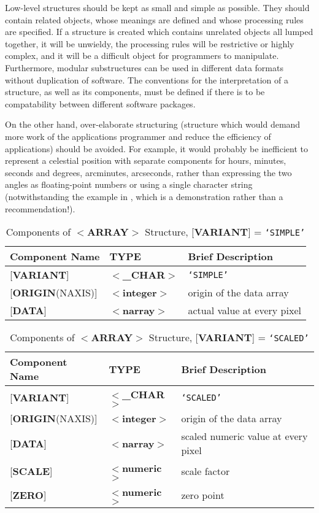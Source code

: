 Low-level structures should be kept as small and simple as possible.
They should contain related objects, whose meanings are defined and
whose processing rules are specified.  If a
structure is created
which contains unrelated objects all lumped together, it
will be unwieldy, the
processing rules will be restrictive or highly complex, and it will
be a difficult object for programmers to manipulate.  Furthermore,
modular substructures can be used in different data formats without
duplication of software. The conventions for the interpretation of a
structure, as well as its components,
must be defined if there is to be compatability between
different software packages. 

On the other hand, over-elaborate structuring (structure which would
demand more work of the applications programmer and reduce the
efficiency of applications) should be avoided.  For example, it
would probably be inefficient to represent a
celestial position with separate components for hours, minutes, seconds
and degrees, arcminutes, arcseconds, rather than expressing
the two angles as floating-point numbers or using
a single character string (notwithstanding the example in 
, which is a demonstration rather than a recommendation!). 

\begin{table}[htb]
\centering
\caption{Components of $<${\bf ARRAY}$>$ Structure,
{[}{\bf VARIANT}{]} = {\tt `SIMPLE'}}
\label{ta:example2}
\begin{tabular}{|l|l|l|}
\hline
Component Name  & TYPE & Brief Description \\ \hline
{[}{\bf VARIANT}{]} & $<${\bf \_CHAR}$>$ & {\tt `SIMPLE'} \\
{[}{\bf ORIGIN}(NAXIS){]} & $<${\bf integer}$>$ & origin of the data array \\
{[}{\bf DATA}{]} & $<${\bf narray}$>$ & actual value at every pixel \\ \hline
\end{tabular}
\end{table}

\begin{table}[htb]
\centering
\caption{Components of $<${\bf ARRAY}$>$ Structure,
{[}{\bf VARIANT}{]} = {\tt `SCALED'}}
\label{ta:example3}
\begin{tabular}{|l|l|l|}
\hline
Component Name & TYPE & Brief Description \\ \hline
{[}{\bf VARIANT}{]} & $<${\bf \_CHAR}$>$ & {\tt `SCALED'} \\
{[}{\bf ORIGIN}(NAXIS){]} & $<${\bf integer}$>$ & origin of the data array \\
{[}{\bf DATA}{]} & $<${\bf narray}$>$ & scaled numeric value at every pixel \\
{[}{\bf SCALE}{]} & $<${\bf numeric}$>$ & scale factor \\
{[}{\bf ZERO}{]} & $<${\bf numeric}$>$ & zero point \\ \hline
\end{tabular}
\end{table}


